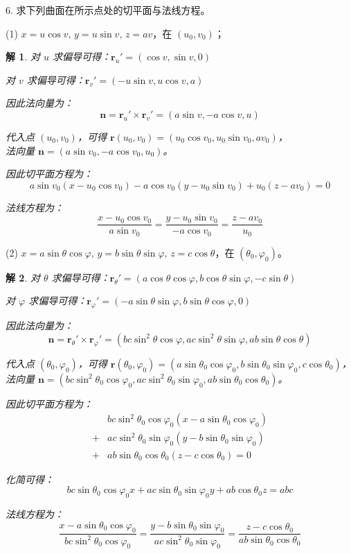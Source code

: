 \documentclass[a4paper,12pt]{article}
\newtheorem*{sol}{解}
\begin{document}
6. 求下列曲面在所示点处的切平面与法线方程。

(1) $x=u\cos v,\,y=u\sin v,\,z=av$，在 $(u_0,v_0)$；

\begin{sol}
    对 $u$ 求偏导可得：$\boldsymbol{r}_u'=(\cos v,\sin v,0)$

    对 $v$ 求偏导可得：$\boldsymbol{r}_v'=(-u\sin v,u\cos v,a)$

    因此法向量为：
    $$\boldsymbol{n}=\boldsymbol{r}_u'\times \boldsymbol{r}_v'=(a\sin v,-a\cos v,u)$$

    代入点 $(u_0,v_0)$，可得 $\boldsymbol{r}(u_0,v_0)=(u_0\cos v_0,u_0\sin v_0,av_0)$，\\法向量 $\boldsymbol{n}=(a\sin v_0,-a\cos v_0,u_0)$。

    因此切平面方程为：
    $$a\sin v_0(x-u_0\cos v_0)-a\cos v_0(y-u_0\sin v_0)+u_0(z-av_0)=0$$

    法线方程为：
    $$\frac{x-u_0\cos v_0}{a\sin v_0}=\frac{y-u_0\sin v_0}{-a\cos v_0}=\frac{z-av_0}{u_0}$$
\end{sol}

(2) $x=a\sin\theta\cos\varphi,\,y=b\sin\theta\sin\varphi,\,z=c\cos\theta$，在 $(\theta_0,\varphi_0)$。

\begin{sol}
    对 $\theta$ 求偏导可得：$\boldsymbol{r}_\theta'=(a\cos\theta\cos\varphi,b\cos\theta\sin\varphi,-c\sin\theta)$

    对 $\varphi$ 求偏导可得：$\boldsymbol{r}_\varphi'=(-a\sin\theta\sin\varphi,b\sin\theta\cos\varphi,0)$

    因此法向量为：
    $$\boldsymbol{n}=\boldsymbol{r}_\theta'\times \boldsymbol{r}_\varphi'=(bc\sin^2\theta\cos\varphi,ac\sin^2\theta\sin\varphi,ab\sin\theta\cos\theta)$$

    代入点 $(\theta_0,\varphi_0)$，可得 $\boldsymbol{r}(\theta_0,\varphi_0)=(a\sin\theta_0\cos\varphi_0,b\sin\theta_0\sin\varphi_0,c\cos\theta_0)$，\\法向量 $\boldsymbol{n}=(bc\sin^2\theta_0\cos\varphi_0,ac\sin^2\theta_0\sin\varphi_0,ab\sin\theta_0\cos\theta_0)$。

    因此切平面方程为：
    \begin{align*}
          & bc\sin^2\theta_0\cos\varphi_0(x-a\sin\theta_0\cos\varphi_0) \\
        + & ac\sin^2\theta_0\sin\varphi_0(y-b\sin\theta_0\sin\varphi_0) \\
        + & ab\sin\theta_0\cos\theta_0(z-c\cos\theta_0)=0
    \end{align*}

    化简可得：
    $$bc\sin\theta_0\cos\varphi_0x+ac\sin\theta_0\sin\varphi_0y+ab\cos\theta_0z=abc$$

    法线方程为：
    $$\frac{x-a\sin\theta_0\cos\varphi_0}{bc\sin^2\theta_0\cos\varphi_0}=\frac{y-b\sin\theta_0\sin\varphi_0}{ac\sin^2\theta_0\sin\varphi_0}=\frac{z-c\cos\theta_0}{ab\sin\theta_0\cos\theta_0}$$
\end{sol}
\end{document}
